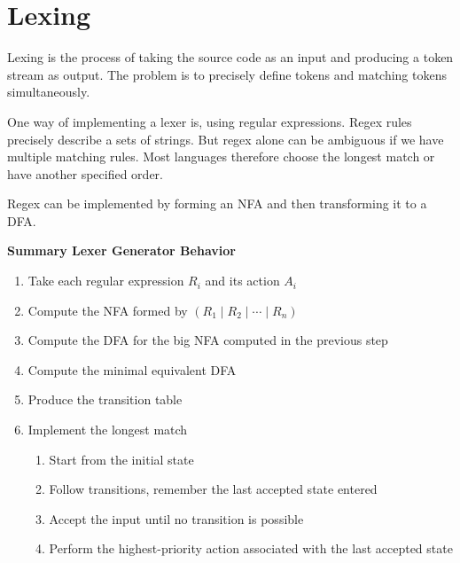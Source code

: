 \section*{Lexing}

Lexing is the process of taking the source code as an input and producing a token stream as output. The problem is to precisely define tokens and matching tokens simultaneously.\medskip

One way of implementing a lexer is, using regular expressions. Regex rules precisely describe a sets of strings. But regex alone can be ambiguous if we have multiple matching rules. Most languages therefore choose the longest match or have another specified order. \medskip

Regex can be implemented by forming an NFA and then transforming it to a DFA.

\textbf{Summary Lexer Generator Behavior}
\begin{enumerate}
    \item Take each regular expression $R_i$ and its action $A_i$
    \item Compute the NFA formed by $(R_1 \mid R_2 \mid \cdots \mid R_n)$
    \item Compute the DFA for the big NFA computed in the previous step
    \item Compute the minimal equivalent DFA
    \item Produce the transition table
    \item Implement the longest match
    \begin{enumerate}
        \item Start from the initial state
        \item Follow transitions, remember the last accepted state entered
        \item Accept the input until no transition is possible
        \item Perform the highest-priority action associated with the last accepted state
    \end{enumerate}
\end{enumerate}
